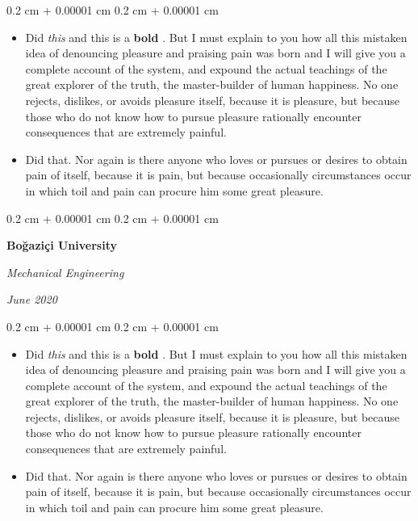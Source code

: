 \documentclass[10pt, letterpaper]{article}
\newenvironment{highlights}{
    \begin{itemize}[
        topsep=0.10 cm,
        parsep=0.10 cm,
        partopsep=0pt,
        itemsep=0pt,
        leftmargin=0.4 cm + 10pt
    ]
}{
    \end{itemize}
} %
\newenvironment{onecolentry}{
    \begin{adjustwidth}{
        0.2 cm + 0.00001 cm
    }{
        0.2 cm + 0.00001 cm
    }
}{
    \end{adjustwidth}
} %
\newenvironment{twocolentry}[2][]{
    \onecolentry
    \def\secondColumn{#2}
    \setcolumnwidth{\fill, 4.5 cm}
    \begin{paracol}{2}
}{
    \switchcolumn \raggedleft \secondColumn
    \end{paracol}
    \endonecolentry
} %
\let\hrefWithoutArrow\href
\renewcommand{\href}[2]{\hrefWithoutArrow{#1}{\mbox{\ifthenelse{\equal{#2}{}}{ }{#2 }\raisebox{.15ex}{\footnotesize \faExternalLink*}}}}
\begin{document}
        \vspace{0.10 cm-3px}
        \begin{onecolentry}
            \begin{highlights}
                \item Did \textit{this} and this is a \textbf{bold} \href{https://example.com}{link}. But I must explain to you how all this mistaken idea of denouncing pleasure and praising pain was born and I will give you a complete account of the system, and expound the actual teachings of the great explorer of the truth, the master-builder of human happiness. No one rejects, dislikes, or avoids pleasure itself, because it is pleasure, but because those who do not know how to pursue pleasure rationally encounter consequences that are extremely painful.
                \item Did that. Nor again is there anyone who loves or pursues or desires to obtain pain of itself, because it is pain, but because occasionally circumstances occur in which toil and pain can procure him some great pleasure.
            \end{highlights}
        \end{onecolentry}


        \vspace{0.2 cm-3px}

        \begin{twocolentry}{
            
            
        \textit{June 2020}}
            \textbf{Boğaziçi University}

            \textit{Mechanical Engineering}
        \end{twocolentry}

        \vspace{0.10 cm-3px}
        \begin{onecolentry}
            \begin{highlights}
                \item Did \textit{this} and this is a \textbf{bold} \href{https://example.com}{link}. But I must explain to you how all this mistaken idea of denouncing pleasure and praising pain was born and I will give you a complete account of the system, and expound the actual teachings of the great explorer of the truth, the master-builder of human happiness. No one rejects, dislikes, or avoids pleasure itself, because it is pleasure, but because those who do not know how to pursue pleasure rationally encounter consequences that are extremely painful.
                \item Did that. Nor again is there anyone who loves or pursues or desires to obtain pain of itself, because it is pain, but because occasionally circumstances occur in which toil and pain can procure him some great pleasure.
            \end{highlights}
        \end{onecolentry}
\end{document}
